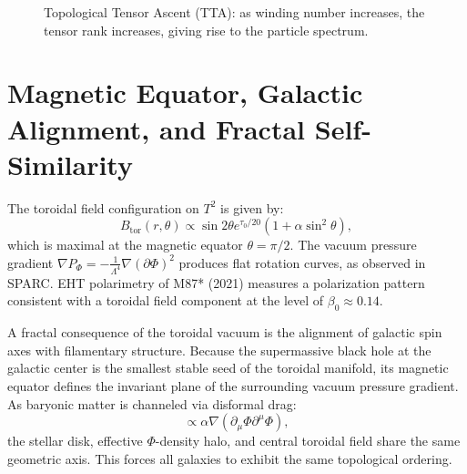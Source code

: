 \documentclass[11pt,a4paper]{article}
\begin{document}
\begin{figure}[H]
\centering
{}
\caption{Topological Tensor Ascent (TTA): as winding number increases, the tensor rank increases, giving rise to the particle spectrum.}
\end{figure}

\section{Magnetic Equator, Galactic Alignment, and Fractal Self-Similarity}

The toroidal field configuration on \(T^2\) is given by:
\begin{equation}
B_{\mathrm{tor}}(r,\theta)\propto \sin 2\theta e^{\tau_0 / 20}(1 + \alpha \sin^2\theta), \tag{31}
\end{equation}
which is maximal at the magnetic equator \(\theta = \pi /2\). The vacuum pressure gradient \(\nabla P_{\Phi} = - \frac{1}{\Lambda^4}\nabla (\partial \Phi)^2\) produces flat rotation curves, as observed in SPARC. EHT polarimetry of M87* (2021) measures a polarization pattern consistent with a toroidal field component at the level of \(\beta_{0}\approx 0.14\).

A fractal consequence of the toroidal vacuum is the alignment of galactic spin axes with filamentary structure. Because the supermassive black hole at the galactic center is the smallest stable seed of the toroidal manifold, its magnetic equator defines the invariant plane of the surrounding vacuum pressure gradient. As baryonic matter is channeled via disformal drag:
\begin{equation}
\propto \alpha \nabla (\partial_{\mu}\Phi \partial^{\mu}\Phi), \tag{32}
\end{equation}
the stellar disk, effective \(\Phi\)-density halo, and central toroidal field share the same geometric axis. This forces all galaxies to exhibit the same topological ordering.
\end{document}
